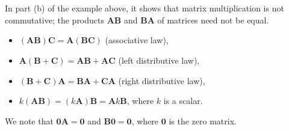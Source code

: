 \documentclass[../setup.tex]{subfiles}
\begin{document}
\phantom \\ \\
In part (b) of the example above, it shows that matrix multiplication is not commutative; the products $\bm{AB}$ and $\bm{BA}$ of matrices need not be equal. \\
\begin{theorem}
\begin{itemize}
	\item $(\bm{AB})\bm{C} = \bm{A}(\bm{BC})$ (associative law),
	\item $\bm{A}(\bm{B} + \bm{C}) = \bm{AB} + \bm{AC}$ (left distributive law),
	\item $(\bm{B} + \bm{C})\bm{A} = \bm{BA} + \bm{CA}$ (right distributive law),
	\item $k(\bm{AB}) = (k\bm{A})\bm{B} = \bm{A}k\bm{B}$, where $k$ is a scalar.
\end{itemize}
We note that $\bm{0A} = \bm{0}$ and $\bm{B0} = \bm{0}$, where $\bm{0}$ is the zero matrix.
\end{theorem}
\pagebreak
\end{document}
